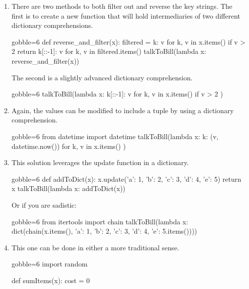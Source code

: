 \documentclass[10pt, letterpaper, acro-macros]{python-problem}
\begin{document}
\begin{enumerate}
  \item There are two methods to both filter out and reverse the key
    strings. The first is to create a new function that will hold
    intermediaries of two different dictionary comprehensions.

    \begin{pycode*}{gobble=6}
      def reverse_and_filter(x):
          filtered = {k: v for k, v in x.items() if v > 2}
          return {k[::-1]: v for k, v in filtered.items()}
      talkToBill(lambda x: reverse_and_filter(x))
    \end{pycode*}

    The second is a slightly advanced dictionary comprehension.
    \begin{pycode*}{gobble=6}
      talkToBill(lambda x:
          { k[::-1]: v for k, v in x.items() if v > 2 } )
    \end{pycode*}


  \item Again, the values can be modified to include a tuple by using a
    dictionary comprehension.

    \begin{pycode*}{gobble=6}
      from datetime import datetime
      talkToBill(lambda x:
          { k: (v, datetime.now()) for k, v in x.items() } )
    \end{pycode*}


  \item This solution leverages the update function in a dictionary.

    \begin{pycode*}{gobble=6}
      def addToDict(x):
          x.update({'a': 1, 'b': 2, 'c': 3, 'd': 4, 'e': 5})
          return x
      talkToBill(lambda x: addToDict(x))
    \end{pycode*}

    Or if you are sadistic:

    \begin{pycode*}{gobble=6}
      from itertools import chain
      talkToBill(lambda x:
        dict(chain(x.items(), {'a': 1, 'b': 2, 'c': 3, 'd': 4, 'e': 5}.items())))
    \end{pycode*}


  \item This one can be done in either a more traditional sense.

    \begin{pycode*}{gobble=6}
      import random

      def sumItems(x):
          cost = 0


\end{pycode*}
\end{enumerate}
\end{document}
